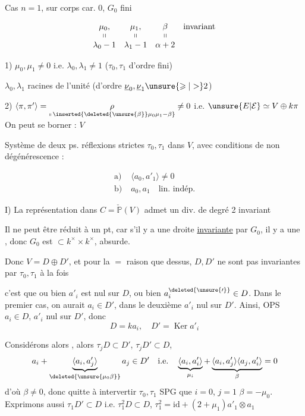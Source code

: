 Cas $n=1$, sur corps  car. 0, $G_{0}$ fini

\[
\begin{array}{cccl}
\mu_0,&\mu_1,&\beta&\text{invariant}\\[-2pt]
\shortparallel&\shortparallel&\shortparallel&\\
\lambda_0-1&\lambda_1-1&\alpha+2&
\end{array}
\]

1) $\mu_0,\mu_1\ne0$ i.e. $\lambda_0,\lambda_1\ne1$ \quad ($\tau_0,\tau_1$ d'ordre fini)

$\lambda_0,\lambda_1$ racines de l'unité (d'ordre $\underline{\nu}_0,\underline{\nu}_1\unsure{\geqslant|>}2$)

2) $\langle\pi,\pi'\rangle=\underset{\shortparallel\,\inserted{\deleted{\unsure{\beta}}\mu_0\mu_1-\beta}}{\rho}\ne0$ \quad i.e. $\unsure{E|\mathcal E}\simeq V\oplus k\pi$ \qquad On peut se borner : $V$

Système de deux ps. réflexions strictes $\tau_0,\tau_1$ dans $V$, avec conditions de non dégénérescence :

\[
\begin{aligned}
\text{a)}\;&\langle a_0,a'_1\rangle\ne0\\
\text{b)}\;&a_0,a_1\quad\text{lin. indép.}
\end{aligned}
\]

I) La représentation dans $C=\check{\mathbb P}(V)$ admet un div. de degré 2 invariant

Il ne peut être réduit à un pt, car s'il y a une droite  \uline{invariante} par $G_0$, il y a une , donc $G_0$ est  $\subset k^\times\times k^\times$, absurde.

Donc $V=D\oplus D'$, et pour la $=$ raison que dessus, $D,D'$ ne sont pas invariantes par $\tau_0,\tau_1$ à la fois

  c'est que ou bien $a'_i$ est nul sur $D$, ou bien $a^{\deleted{\unsure{\prime}}}_i\in D$. Dans le premier cas, on aurait $a_i\in D'$, dans le deuxième $a'_i$ nul sur $D'$. Ainsi, OPS $a_i\in D$, $a'_i$ nul sur $D'$, donc
\[
D=ka_i,\quad D'=\operatorname{Ker}a'_i
\]

Considérons alors  , alors $\tau_jD\subset D'$, $\tau_jD'\subset D$,
\[
a_i+\underbrace{\langle a_i,a'_j\rangle}_{\deleted{\unsure{\mu_0\beta}}}a_j\in D'
\quad\text{i.e.}\quad
\underbrace{\langle a_i,a'_i\rangle}_{\mu_i}
+\underbrace{\langle a_i,a'_j\rangle\langle a_j,a'_i\rangle}_{\beta}=0
\]
d'où $\beta\ne0$, donc quitte à intervertir $\tau_0,\tau_1$ SPG que $i=0$, $j=1$ \quad $\beta=-\mu_0$. Exprimons aussi $\tau_1D'\subset D$ i.e. $\tau_1^2D\subset D$, $\tau_1^2=\mathrm{id}+(2+\mu_1)a'_1\otimes a_1$
